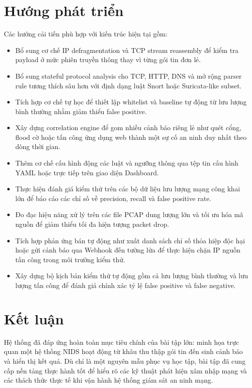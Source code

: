 \section{Hướng phát triển}
Các hướng cải tiến phù hợp với kiến trúc hiện tại gồm:
\begin{itemize}
    \item Bổ sung cơ chế IP defragmentation và TCP stream reassembly để kiểm tra payload ở mức phiên truyền thông thay vì từng gói tin đơn lẻ.
    \item Bổ sung stateful protocol analysis cho TCP, HTTP, DNS và mở rộng parser rule tương thích sâu hơn với định dạng luật Snort hoặc Suricata-like subset.
    \item Tích hợp cơ chế tự học để thiết lập whitelist và baseline tự động từ lưu lượng bình thường nhằm giảm thiểu false positive.
    \item Xây dựng correlation engine để gom nhiều cảnh báo riêng lẻ như quét cổng, flood cờ hoặc tấn công ứng dụng web thành một sự cố an ninh duy nhất theo dòng thời gian.
    \item Thêm cơ chế cấu hình động các luật và ngưỡng thông qua tệp tin cấu hình YAML hoặc trực tiếp trên giao diện Dashboard.
    \item Thực hiện đánh giá kiểm thử trên các bộ dữ liệu lưu lượng mạng công khai lớn để báo cáo các chỉ số về precision, recall và false positive rate.
    \item Đo đạc hiệu năng xử lý trên các file PCAP dung lượng lớn và tối ưu hóa mã nguồn để giảm thiểu tối đa hiện tượng packet drop.
    \item Tích hợp phản ứng bán tự động như xuất danh sách chỉ số thỏa hiệp độc hại hoặc gửi cảnh báo qua Webhook đến tường lửa để thực hiện chặn IP nguồn tấn công trong môi trường kiểm thử.
    \item Xây dựng bộ kịch bản kiểm thử tự động gồm cả lưu lượng bình thường và lưu lượng tấn công để đánh giá chính xác tỷ lệ false positive và false negative.
\end{itemize}

\section{Kết luận}
Hệ thống đã đáp ứng hoàn toàn mục tiêu chính của bài tập lớn: minh họa trực quan một hệ thống NIDS hoạt động từ khâu thu thập gói tin đến sinh cảnh báo và hiển thị kết quả. Dù chỉ là một nguyên mẫu phục vụ học tập, bài tập đã cung cấp nền tảng thực hành tốt để hiểu rõ các kỹ thuật phát hiện xâm nhập mạng và các thách thức thực tế khi vận hành hệ thống giám sát an ninh mạng.
